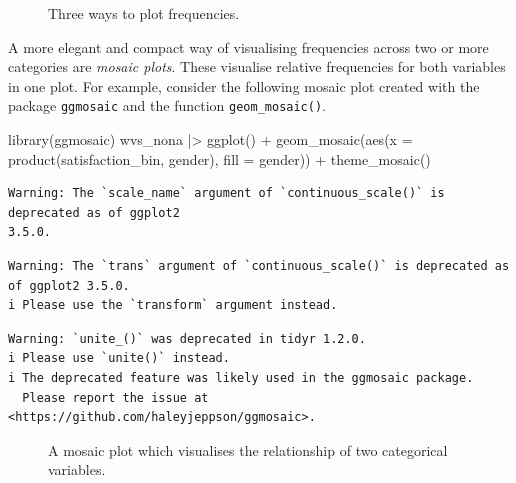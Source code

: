 \documentclass[
  letterpaper,
]{krantz}
\makeatletter
\newenvironment{Shaded}{\begin{snugshade}}{\end{snugshade}}
\newcommand{\AttributeTok}[1]{\textcolor[rgb]{0.40,0.45,0.13}{#1}}
\newcommand{\FunctionTok}[1]{\textcolor[rgb]{0.28,0.35,0.67}{#1}}
\newcommand{\NormalTok}[1]{\textcolor[rgb]{0.00,0.23,0.31}{#1}}
\newcommand{\SpecialCharTok}[1]{\textcolor[rgb]{0.37,0.37,0.37}{#1}}
\newenvironment{kframe}{%
\medskip{}
\setlength{\fboxsep}{.8em}
 \def\at@end@of@kframe{}%
 \ifinner\ifhmode%
  \def\at@end@of@kframe{\end{minipage}}%
  \begin{minipage}{\columnwidth}%
 \fi\fi%
 \def\FrameCommand##1{\hskip\@totalleftmargin \hskip-\fboxsep
 \colorbox{shadecolor}{##1}\hskip-\fboxsep
     \hskip-\linewidth \hskip-\@totalleftmargin \hskip\columnwidth}%
 \MakeFramed {\advance\hsize-\width
   \@totalleftmargin\z@ \linewidth\hsize
   \@setminipage}}%
 {\par\unskip\endMakeFramed%
 \at@end@of@kframe}
\renewenvironment{Shaded}{\begin{kframe}}{\end{kframe}}
\makeatother
\begin{document}
\begin{figure}[H]


\caption{\label{fig-three-plots-satisfaction-gender}Three ways to plot
frequencies.}

\end{figure}%

A more elegant and compact way of visualising frequencies across two or
more categories are \emph{mosaic plots}. These visualise relative
frequencies for both variables in one plot. For example, consider the
following mosaic plot created with the package \texttt{ggmosaic} and the
function \texttt{geom\_mosaic()}.

\begin{Shaded}
\begin{Highlighting}[]
\FunctionTok{library}\NormalTok{(ggmosaic)}
\NormalTok{wvs\_nona }\SpecialCharTok{|\textgreater{}}
  \FunctionTok{ggplot}\NormalTok{() }\SpecialCharTok{+}
  \FunctionTok{geom\_mosaic}\NormalTok{(}\FunctionTok{aes}\NormalTok{(}\AttributeTok{x =} \FunctionTok{product}\NormalTok{(satisfaction\_bin, gender),}
                            \AttributeTok{fill =}\NormalTok{ gender)) }\SpecialCharTok{+}
  \FunctionTok{theme\_mosaic}\NormalTok{()}
\end{Highlighting}
\end{Shaded}

\begin{verbatim}
Warning: The `scale_name` argument of `continuous_scale()` is deprecated as of ggplot2
3.5.0.
\end{verbatim}

\begin{verbatim}
Warning: The `trans` argument of `continuous_scale()` is deprecated as of ggplot2 3.5.0.
i Please use the `transform` argument instead.
\end{verbatim}

\begin{verbatim}
Warning: `unite_()` was deprecated in tidyr 1.2.0.
i Please use `unite()` instead.
i The deprecated feature was likely used in the ggmosaic package.
  Please report the issue at <https://github.com/haleyjeppson/ggmosaic>.
\end{verbatim}

\begin{figure}[H]


\caption{\label{fig-mosaic-plot}A mosaic plot which visualises the
relationship of two categorical variables.}

\end{figure}%
\end{document}
